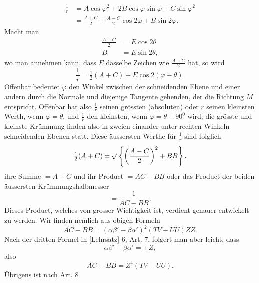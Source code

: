 %
\[
\begin{aligned}
\frac1r&=A\cos\varphi^{2}+2B\cos\varphi\sin\varphi+C\sin\varphi^{2}\\
&=\frac{A+C}{2}+\frac{A-C}{2}\cos2\varphi+B\sin2\varphi.
\end{aligned}
\]
Macht man
\[
\begin{aligned}
\frac{A-C}{2}&=E\cos2\theta\\
B&=E\sin2\theta,
\end{aligned}
\]
wo man annehmen kann, dass $E$ dasselbe Zeichen wie $\frac{A-C}{2}$ hat, so wird
\[
\frac1r=\tfrac12(A+C)+E\cos2(\varphi-\theta).
\]
Offenbar bedeutet $\varphi$ den Winkel zwischen der schneidenden Ebene und einer andern durch die Normale und diejenige Tangente gehenden, der die Richtung $M$ entspricht. Offenbar hat also $\frac1r$ seinen grössten (absoluten) oder $r$ seinen kleinsten Werth, wenn $\varphi=\theta$, und $\frac1r$ den kleinsten, wenn $\varphi=\theta+90^{0}$ wird; die grösste und kleinste Krümmung finden also in zweien einander unter rechten Winkeln schneidenden Ebenen statt. Diese äussersten Werthe für $\frac1r$ sind folglich
\[
\tfrac12(A+C)\pm\mathord{\surd}\left\{\left(\frac{A-C}{2}\right)^{2}+BB\right\},
\]
ihre Summe $=A+C$ und ihr Product $=AC-BB$ oder das Product der beiden äussersten Krümmungshalbmesser
\[
=\frac{1}{AC-BB}.
\]
Dieses Product, welches von grosser Wichtigkeit ist, verdient genauer entwickelt zu werden. Wir finden nemlich aus obigen Formeln
\[
AC-BB=(\alpha\beta'-\beta\alpha')^{2}(TV-UU)ZZ.
\]
Nach der dritten Formel in [Lehrsatz] $6$, Art. $7$, folgert man aber leicht, dass
\[
\alpha\beta'-\beta\alpha'=\pm Z,
\]
also
\[
AC-BB=Z^{4}(TV-UU).
\]
Übrigens ist nach Art. $8$
